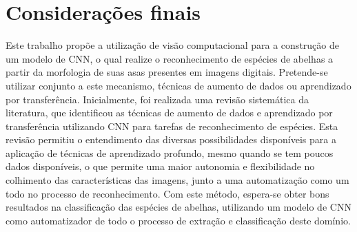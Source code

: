 \documentclass[
	12pt,				%
	oneside,			%
	a4paper,			%
	english,			%
	brazil				%
	]{abntex2ppgsi}
\begin{document}
\section{Considerações finais}
Este trabalho propõe a utilização de visão computacional para a construção de um modelo de CNN, o qual realize o reconhecimento de espécies de abelhas a partir da morfologia de suas asas presentes em imagens digitais. Pretende-se utilizar conjunto a este mecanismo, técnicas de aumento de dados ou aprendizado por transferência. Inicialmente, foi realizada uma revisão sistemática da literatura, que identificou as técnicas de aumento de dados e aprendizado por transferência utilizando CNN para tarefas de reconhecimento de espécies. Esta revisão permitiu o entendimento das diversas possibilidades disponíveis para a aplicação de técnicas de aprendizado profundo, mesmo quando se tem poucos dados disponíveis, o que permite uma maior autonomia e flexibilidade no colhimento das características das imagens, junto a uma automatização como um todo no processo de reconhecimento. Com este método, espera-se obter bons resultados na classificação das espécies de abelhas, utilizando um modelo de CNN como automatizador de todo o processo de extração e classificação deste domínio.

\postextual



%
%




%
%
%
\end{document}
